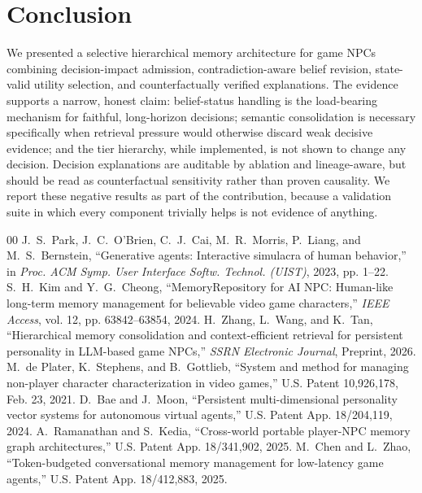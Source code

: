 \documentclass[conference]{IEEEtran}
\begin{document}
\section{Conclusion}
We presented a selective hierarchical memory architecture for game NPCs combining decision-impact admission, contradiction-aware belief revision, state-valid utility selection, and counterfactually verified explanations. The evidence supports a narrow, honest claim: belief-status handling is the load-bearing mechanism for faithful, long-horizon decisions; semantic consolidation is necessary specifically when retrieval pressure would otherwise discard weak decisive evidence; and the tier hierarchy, while implemented, is not shown to change any decision. Decision explanations are auditable by ablation and lineage-aware, but should be read as counterfactual sensitivity rather than proven causality. We report these negative results as part of the contribution, because a validation suite in which every component trivially helps is not evidence of anything.

\begin{thebibliography}{00}
 J.~S.~Park, J.~C.~O'Brien, C.~J.~Cai, M.~R.~Morris, P.~Liang, and M.~S.~Bernstein, ``Generative agents: Interactive simulacra of human behavior,'' in \textit{Proc. ACM Symp. User Interface Softw. Technol. (UIST)}, 2023, pp. 1--22.
 S.~H.~Kim and Y.~G.~Cheong, ``MemoryRepository for AI NPC: Human-like long-term memory management for believable video game characters,'' \textit{IEEE Access}, vol. 12, pp. 63842--63854, 2024.
 H.~Zhang, L.~Wang, and K.~Tan, ``Hierarchical memory consolidation and context-efficient retrieval for persistent personality in LLM-based game NPCs,'' \textit{SSRN Electronic Journal}, Preprint, 2026.
 M.~de Plater, K.~Stephens, and B.~Gottlieb, ``System and method for managing non-player character characterization in video games,'' U.S. Patent 10,926,178, Feb. 23, 2021.
 D.~Bae and J.~Moon, ``Persistent multi-dimensional personality vector systems for autonomous virtual agents,'' U.S. Patent App. 18/204,119, 2024.
 A.~Ramanathan and S.~Kedia, ``Cross-world portable player-NPC memory graph architectures,'' U.S. Patent App. 18/341,902, 2025.
 M.~Chen and L.~Zhao, ``Token-budgeted conversational memory management for low-latency game agents,'' U.S. Patent App. 18/412,883, 2025.
\end{thebibliography}
\end{document}
